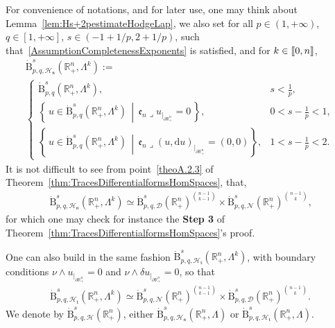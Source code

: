 \documentclass[AHL,Unicode,longabstracts,published]{cedram}
\newcommand{\bbR}{\mathbb{R}}
\newcommand{\rmB}{\mathrm{B}}
\newcommand{\rmd}{\mathrm{d}}
\newcommand{\clH}{\mathcal{H}}
\newcommand{\clN}{\mathcal{N}}
\newcommand{\clD}{\mathcal{D}}
\newcommand{\fkn}{\mathfrak{n}}
\newcommand{\fke}{\mathfrak{e}}
\newcommand{\fkt}{\mathfrak{t}}
\newcommand{\llbracket}{\mathopen{[\mkern -2.7mu[}}
\newcommand{\rrbracket}{\mathclose{]\mkern -2.7mu]}}
\newcommand{\llb}{\llbracket}
\newcommand{\rrb}{\rrbracket}
\newcommand{\iprod}{\mathbin{\lrcorner}}
\begin{document}
For convenience of notations, and for later use, one may think about Lemma~\ref{lem:Hs+2pestimateHodgeLap}, we also set for all $p\in(1,+\infty)$, $q\in[1,+\infty]$, $s\in(-1+1/p,2+1/p)$, such that~\eqref{AssumptionCompletenessExponents} is satisfied, and for $k\in\llb 0,n\rrb$,
\begin{multline}\label{eq:defhomBesovwithCompCond}
\dot{\rmB}^{s}_{p,q,\clH_\fkn}\left(\bbR^n_+,\Lambda^k\right):=\\
\begin{cases}
\dot{\rmB}^{s}_{p,q}\left(\bbR^n_+,\Lambda^k\right),  & s < \frac{1}{p},\\
\left\{ \,u\in \dot{\rmB}^{s}_{p,q}\left(\bbR^n_+,\Lambda^k\right)\, \middle|\, \fke _n\iprod u_{|_{\partial\bbR^n_+}}=0 \,\right\}, & 0< s -\frac{1}{p} < 1,\\[0.70em]
\left\{ \,u\in \dot{\rmB}^{s}_{p,q}\left(\bbR^n_+,\Lambda^k\right)\, \middle|\, \fke _n\iprod (u,\rmd u)_{|_{\partial\bbR^n_+}}=(0,0)\right\}, &1 < s -\frac{1}{p} < 2.
\end{cases}
\end{multline}
It is not difficult to see from point~\eqref{theoA.2.3} of Theorem~\ref{thm:TracesDifferentialformsHomSpaces}, that,
\begin{align*}
\dot{\rmB}^{s}_{p,q,\clH_\fkn}(\bbR^n_+,\Lambda^k) \simeq \dot{\rmB}^{s}_{p,q,\clD}(\bbR^n_+)^{\binom{n-1}{k-1}}\times\dot{\rmB}^{s}_{p,q,\clN}(\bbR^n_+)^{\binom{n-1}{k}} \text{,}
\end{align*}
for which one may check for instance the \textbf{Step 3} of Theorem~\ref{thm:TracesDifferentialformsHomSpaces}'s proof.

One can also build in the same fashion $\dot{\rmB}^{s}_{p,q,\clH_\fkt}(\bbR^n_+,\Lambda^k)$, with boundary conditions $\nu\wedge u_{|_{\partial\bbR^n_+}}=0$ and $\nu\wedge \delta u_{|_{\partial\bbR^n_+}}=0$, so that
\begin{align*}
\dot{\rmB}^{s}_{p,q,\clH_\fkt}\left(\bbR^n_+,\Lambda^k\right) \simeq \dot{\rmB}^{s}_{p,q,\clN}\left(\bbR^n_+\right)^{\binom{n-1}{k-1}}\times\dot{\rmB}^{s}_{p,q,\clD}\left(\bbR^n_+\right)^{\binom{n-1}{k}} .
\end{align*}
We denote by $\dot{\rmB}^{s}_{p,q,\clH}(\bbR^n_+)$, either $\dot{\rmB}^{s}_{p,q,\clH_\fkn}(\bbR^n_+,\Lambda)$ or $\dot{\rmB}^{s}_{p,q,\clH_\fkt}(\bbR^n_+,\Lambda)$.
\end{document}
